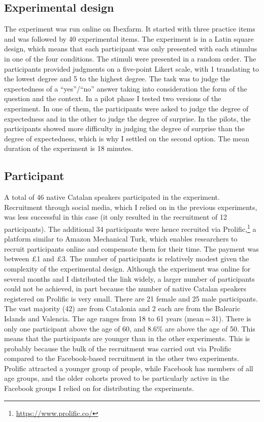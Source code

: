 \subsection{Experimental design}
The experiment was run online on Ibexfarm. It started with three practice items and was followed by 40 experimental items. The experiment is in a Latin square design, which means that each participant was only presented with each stimulus in one of the four conditions. The stimuli were presented in a random order. The participants provided  judgments on a five-point Likert scale, with 1 translating to the lowest degree and 5 to the highest degree.  The task was to judge the expectedness of a ``yes''/``no'' answer taking into consideration the form of the question and the context. In a pilot phase I tested two versions of the experiment. In one of them, the participants were asked to judge the degree of expectedness and in the other to judge the degree of surprise. In the pilots, the participants showed more difficulty in  judging the degree of surprise than the degree of expectedness, which is why I settled on the second option.  The mean duration of the experiment is 18 minutes.

\subsection{Participant}
A total of 46 native Catalan speakers participated in the experiment. Recruitment through social media, which I relied on in the previous experiments, was less successful in this case (it only resulted in the recruitment of 12 participants). The additional 34 participants were hence recruited via Prolific,\footnote{\href{prolific.co}{https://www.prolific.co/}} a platform similar to Amazon Mechanical Turk, which enables researchers to recruit participants online and compensate them for their time. The payment was between \pounds 1   and \pounds 3. The number of participants is relatively modest given the complexity of the experimental design. Although the experiment was online for several months and I distributed the link widely, a larger number of participants could not be achieved, in part because the number of native Catalan speakers registered on Prolific is very small.  There are 21 female and 25 male participants. The vast majority (42) are from Catalonia and 2 each are from the Balearic Islands and Valencia. The  age ranges from 18 to 61 years (mean\,=\,31). There is  only one participant above the age of 60, and 8.6\% are above the age of 50. This means that the participants are younger than in the other experiments. This is probably because the bulk of the recruitment was carried out via Prolific compared to the Facebook-based recruitment  in the other two experiments. Prolific attracted a younger group of people, while Facebook has members of all age groups, and the older cohorts proved to be particularly active in the Facebook groups I relied on for distributing the experiments.



